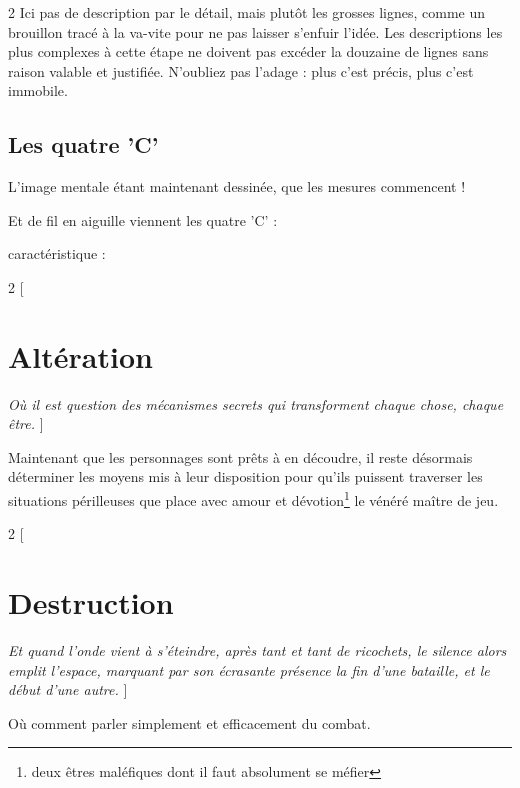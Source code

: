 \documentclass[11pt,oneside]{book}
\begin{document}
\begin{multicols}{2}
Ici pas de description par le détail, mais plutôt les grosses lignes, comme un brouillon tracé à la va-vite pour ne pas laisser s'enfuir l'idée. Les descriptions les plus complexes à cette étape ne doivent pas excéder la douzaine de lignes sans raison valable et justifiée. N'oubliez pas l'adage : plus c'est précis, plus c'est immobile.

\section{Les quatre 'C'}

L'image mentale étant maintenant dessinée, que les mesures commencent !

Et de fil en aiguille viennent les quatre 'C' :

\begin{description}
    \item[caractéristique :] %
\end{description}







\end{multicols}

\begin{multicols}{2}
[
    \chapter{Altération}
    \emph{Où il est question des mécanismes secrets qui transforment chaque chose, chaque être.}
]

Maintenant que les personnages sont prêts à en découdre, il reste désormais déterminer les moyens mis à leur disposition pour qu'ils puissent traverser les situations périlleuses que place avec amour et dévotion\footnote{deux êtres maléfiques dont il faut absolument se méfier} le vénéré maître de jeu.






\end{multicols}

\begin{multicols}{2}
[
    \chapter{Destruction}
    \emph{Et quand l'onde vient à s'éteindre, après tant et tant de ricochets, le silence alors emplit l'espace, marquant par son écrasante présence la fin d'une bataille, et le début d'une autre.}
]


Où comment parler simplement et efficacement du combat.

\end{multicols}
\end{document}
